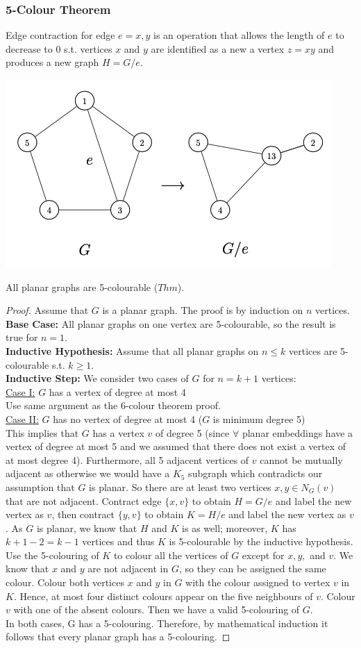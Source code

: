 \documentclass[11pt]{article}
\newcommand{\nl}{\\[5pt]}
\begin{document}
\subsubsection{5-Colour Theorem}
Edge contraction for edge $e = {x,y}$ is an operation that allows the length of $e$ to decrease to 0 s.t. vertices $x$ and $y$ are identified as a new a vertex $z = xy$ and produces a new graph $H = G / e$. 
\begin{center}
    \includegraphics[scale=0.50]{Figures/Contraction.png}
\end{center}
All planar graphs are 5-colourable ($Thm$). 
\begin{proof}
Assume that $G$ is a planar graph. The proof is by induction on $n$ vertices. \nl 
\textbf{Base Case:} All planar graphs on one vertex are 5-colourable, so the result is true for $n = 1$. \nl
\textbf{Inductive Hypothesis:} Assume that all planar graphs on $n \leq k$ vertices are 5-colourable s.t. $k \geq 1$. \nl 
\textbf{Inductive Step:} We consider two cases of $G$ for $n = k + 1$ vertices: \nl 
{\underline{Case I:}} $G$ has a vertex of degree at most 4 \nl 
Use same argument as the 6-colour theorem proof. \nl 
{\underline{Case II:}} $G$ has no vertex of degree at most 4 ($G$ is minimum degree 5) \nl
This implies that $G$ has a vertex $v$ of degree 5 (since $\forall$ planar embeddings have a vertex of degree at most 5 and we assumed that there does not exist a vertex of at most degree 4). Furthermore, all 5 adjacent vertices of $v$ cannot be mutually adjacent as otherwise we would have a $K_5$ subgraph which contradicts our assumption that $G$ is planar. So there are at least two vertices $x, y \in N_G(v)$ that are not adjacent.
Contract edge $\{x, v\}$ to obtain $H = G / e$ and label the new vertex as $v$, then contract $\{y, v\}$ to obtain $K = H / e$ and label the new vertex as $v$. As $G$ is planar, we know that $H$ and $K$ is as well; moreover, $K$ has $k + 1 - 2 = k-1$ vertices and thus $K$ is 5-colourable by the inductive hypothesis. Use the 5-colouring of $K$ to colour all the vertices of $G$ except for $x, y,$ and $v$. We know that $x$ and $y$ are not adjacent in $G$, so they can be assigned the same colour. Colour both vertices $x$ and $y$ in $G$ with the colour assigned to vertex $v$ in $K$. Hence, at most four distinct colours appear on the five neighbours of $v$. Colour $v$ with one of the absent colours. Then we have a valid 5-colouring of $G$. \nl
In both cases, G has a 5-colouring. Therefore, by mathematical induction it follows that every planar graph has a 5-colouring.
\end{proof}
\end{document}
